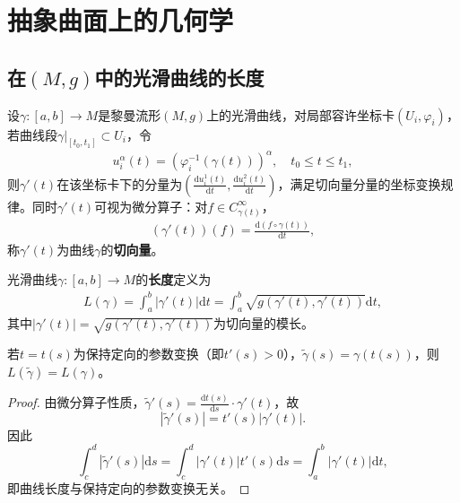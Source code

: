 \documentclass[../../main.tex]{subfiles}%
\begin{document}
\section{抽象曲面上的几何学}

\subsection{在$(M,g)$中的光滑曲线的长度}

\begin{definition}
设$\gamma:[a,b]\to M$是黎曼流形$(M,g)$上的光滑曲线，对局部容许坐标卡$(U_i,\varphi_i)$，若曲线段$\gamma|_{[t_0,t_1]}\subset U_i$，令
\begin{align*}
u_i^\alpha(t)=(\varphi_i^{-1}(\gamma(t)))^\alpha,\quad t_0\leqslant t\leqslant t_1,
\end{align*}
则$\gamma'(t)$在该坐标卡下的分量为$\left(\frac{\mathrm{d}u_i^1(t)}{\mathrm{d}t},\frac{\mathrm{d}u_i^2(t)}{\mathrm{d}t}\right)$，满足切向量分量的坐标变换规律。同时$\gamma'(t)$可视为微分算子：对$f\in C^\infty_{\gamma(t)}$，
\begin{align*}
(\gamma'(t))(f)=\frac{\mathrm{d}(f\circ\gamma(t))}{\mathrm{d}t},
\end{align*}
称$\gamma'(t)$为曲线$\gamma$的\textbf{切向量}。
\end{definition}

\begin{definition}
光滑曲线$\gamma:[a,b]\to M$的\textbf{长度}定义为
\begin{align}
L(\gamma)=\int_{a}^{b}|\gamma'(t)|\mathrm{d}t=\int_{a}^{b}\sqrt{g(\gamma'(t),\gamma'(t))}\mathrm{d}t,\label{eq:curve_length}
\end{align}
其中$|\gamma'(t)|=\sqrt{g(\gamma'(t),\gamma'(t))}$为切向量的模长。
\end{definition}

\begin{theorem}
若$t=t(s)$为保持定向的参数变换（即$t'(s)>0$），$\tilde{\gamma}(s)=\gamma(t(s))$，则$L(\tilde{\gamma})=L(\gamma)$。
\end{theorem}

\begin{proof}

由微分算子性质，$\tilde{\gamma}'(s)=\frac{\mathrm{d}t(s)}{\mathrm{d}s}\cdot\gamma'(t)$，故
\[
|\tilde{\gamma}'(s)|=t'(s)|\gamma'(t)|.
\]
因此
\[
\int_{c}^{d}|\tilde{\gamma}'(s)|\mathrm{d}s=\int_{c}^{d}|\gamma'(t)|t'(s)\mathrm{d}s=\int_{a}^{b}|\gamma'(t)|\mathrm{d}t,
\]
即曲线长度与保持定向的参数变换无关。

\end{proof}
\end{document}
